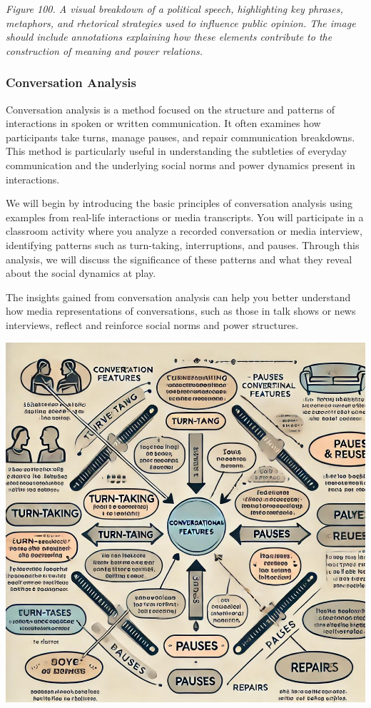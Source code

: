 \documentclass[
]{book}
\begin{document}
\emph{Figure 100. A visual breakdown of a political speech, highlighting key phrases, metaphors, and rhetorical strategies used to influence public opinion. The image should include annotations explaining how these elements contribute to the construction of meaning and power relations.}

\subsubsection{Conversation Analysis}\label{conversation-analysis}

Conversation analysis is a method focused on the structure and patterns of interactions in spoken or written communication. It often examines how participants take turns, manage pauses, and repair communication breakdowns. This method is particularly useful in understanding the subtleties of everyday communication and the underlying social norms and power dynamics present in interactions.

We will begin by introducing the basic principles of conversation analysis using examples from real-life interactions or media transcripts. You will participate in a classroom activity where you analyze a recorded conversation or media interview, identifying patterns such as turn-taking, interruptions, and pauses. Through this analysis, we will discuss the significance of these patterns and what they reveal about the social dynamics at play.

The insights gained from conversation analysis can help you better understand how media representations of conversations, such as those in talk shows or news interviews, reflect and reinforce social norms and power structures.

\includegraphics[width=1\linewidth,height=\textheight,keepaspectratio]{images/fig101.jpg}
\end{document}
